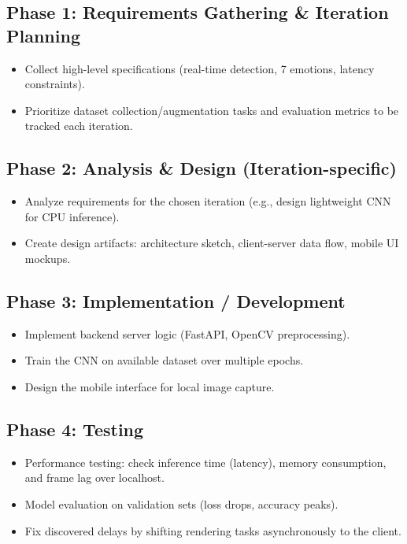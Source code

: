 \documentclass[12pt,a4paper]{report}
\begin{document}
\subsection*{Phase 1: Requirements Gathering \& Iteration Planning}
\begin{itemize}
    \item Collect high-level specifications (real-time detection, 7 emotions, latency constraints).
    \item Prioritize dataset collection/augmentation tasks and evaluation metrics to be tracked each iteration.
\end{itemize}

\subsection*{Phase 2: Analysis \& Design (Iteration-specific)}
\begin{itemize}
    \item Analyze requirements for the chosen iteration (e.g., design lightweight CNN for CPU inference).
    \item Create design artifacts: architecture sketch, client-server data flow, mobile UI mockups.
\end{itemize}

\subsection*{Phase 3: Implementation / Development}
\begin{itemize}
    \item Implement backend server logic (FastAPI, OpenCV preprocessing).
    \item Train the CNN on available dataset over multiple epochs.
    \item Design the mobile interface for local image capture.
\end{itemize}

\subsection*{Phase 4: Testing}
\begin{itemize}
    \item Performance testing: check inference time (latency), memory consumption, and frame lag over localhost.
    \item Model evaluation on validation sets (loss drops, accuracy peaks).
    \item Fix discovered delays by shifting rendering tasks asynchronously to the client.
\end{itemize}
\end{document}
